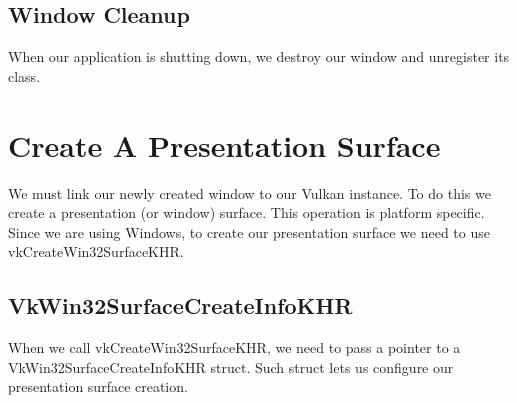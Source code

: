 \begin{minipage}{\linewidth}{\noindent}
    
\end{minipage}

\subsection{Window Cleanup}

When our application is shutting down, we destroy our window and unregister
its class.

\begin{minipage}{\linewidth}{\noindent}
    
\end{minipage}

\section{Create A Presentation Surface}

We must link our newly created window to our Vulkan instance.
To do this we create a presentation (or window) surface.
This operation is platform specific.
Since we are using Windows, to create our presentation surface we need
to use vkCreateWin32SurfaceKHR.

\begin{minipage}{\linewidth}{\noindent}
    
\end{minipage}

\subsection{VkWin32SurfaceCreateInfoKHR}

When we call vkCreateWin32SurfaceKHR, we need to pass a pointer to a
VkWin32SurfaceCreateInfoKHR struct.
Such struct lets us configure our presentation surface creation.

\begin{minipage}{\linewidth}{\noindent}
    
\end{minipage}

